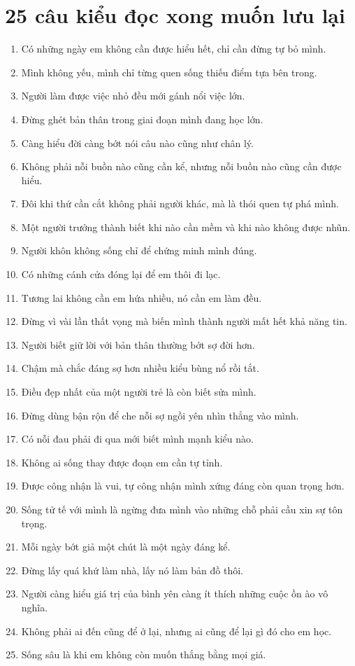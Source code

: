 \section{25 câu kiểu đọc xong muốn lưu lại}
\begin{enumerate}[leftmargin=*,resume]
\item Có những ngày em không cần được hiểu hết, chỉ cần đừng tự bỏ mình.
\item Mình không yếu, mình chỉ từng quen sống thiếu điểm tựa bên trong.
\item Người làm được việc nhỏ đều mới gánh nổi việc lớn.
\item Đừng ghét bản thân trong giai đoạn mình đang học lớn.
\item Càng hiểu đời càng bớt nói câu nào cũng như chân lý.
\item Không phải nỗi buồn nào cũng cần kể, nhưng nỗi buồn nào cũng cần được hiểu.
\item Đôi khi thứ cần cắt không phải người khác, mà là thói quen tự phá mình.
\item Một người trưởng thành biết khi nào cần mềm và khi nào không được nhũn.
\item Người khôn không sống chỉ để chứng minh mình đúng.
\item Có những cánh cửa đóng lại để em thôi đi lạc.
\item Tương lai không cần em hứa nhiều, nó cần em làm đều.
\item Đừng vì vài lần thất vọng mà biến mình thành người mất hết khả năng tin.
\item Người biết giữ lời với bản thân thường bớt sợ đời hơn.
\item Chậm mà chắc đáng sợ hơn nhiều kiểu bùng nổ rồi tắt.
\item Điều đẹp nhất của một người trẻ là còn biết sửa mình.
\item Đừng dùng bận rộn để che nỗi sợ ngồi yên nhìn thẳng vào mình.
\item Có nỗi đau phải đi qua mới biết mình mạnh kiểu nào.
\item Không ai sống thay được đoạn em cần tự tỉnh.
\item Được công nhận là vui, tự công nhận mình xứng đáng còn quan trọng hơn.
\item Sống tử tế với mình là ngừng đưa mình vào những chỗ phải cầu xin sự tôn trọng.
\item Mỗi ngày bớt giả một chút là một ngày đáng kể.
\item Đừng lấy quá khứ làm nhà, lấy nó làm bản đồ thôi.
\item Người càng hiểu giá trị của bình yên càng ít thích những cuộc ồn ào vô nghĩa.
\item Không phải ai đến cũng để ở lại, nhưng ai cũng để lại gì đó cho em học.
\item Sống sâu là khi em không còn muốn thắng bằng mọi giá.
\end{enumerate}


